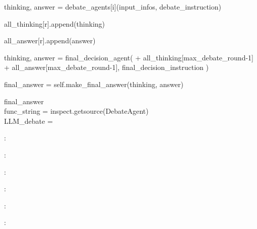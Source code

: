 \begin{subagent}[title={DebateAgent}]
\quad\quad\quad\quad thinking, answer = 
\quad\quad\quad\quad {} debate\_agents[i](input\_infos, debate\_instruction)

\quad\quad\quad all\_thinking[r].append(thinking)

\quad\quad\quad all\_answer[r].append(answer)

\quad {}

\quad thinking, answer = 
\quad {} final\_decision\_agent(
\quad{} 
\quad\quad + all\_thinking[max\_debate\_round-1] 
\quad\quad + all\_answer[max\_debate\_round-1],
\quad\quad final\_decision\_instruction
\quad )

\quad final\_answer = self.make\_final\_answer(thinking, answer)

\quad {} final\_answer \\

func\_string = inspect.getsource(DebateAgent) \\

LLM\_debate = \code{\{}

\quad {}:

\quad {}:

\quad {}: \code{\{}

\quad\quad {}:

\quad\quad {}:

\quad \code{\}}

\quad {}:

\code{\}}

\end{subagent}


